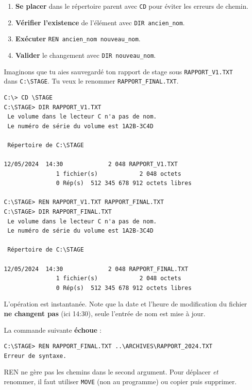 \documentclass[11pt]{article}
\newcommand{\cle}[1]{{\popxbold\color{popdark}#1}}
\begin{document}
\begin{methode}
\begin{enumerate}
    \item \textbf{Se placer} dans le répertoire parent avec \texttt{CD} pour éviter les erreurs de chemin.
    \item \textbf{Vérifier l'existence} de l'élément avec \texttt{DIR ancien\_nom}.
    \item \textbf{Exécuter} \texttt{REN ancien\_nom nouveau\_nom}.
    \item \textbf{Valider} le changement avec \texttt{DIR nouveau\_nom}.
\end{enumerate}
\end{methode}

\begin{exemplebox}
Imaginons que tu aies sauvegardé ton rapport de stage sous \texttt{RAPPORT\_V1.TXT} dans \texttt{C:\textbackslash STAGE}. Tu veux le renommer \texttt{RAPPORT\_FINAL.TXT}.
\begin{lstlisting}
C:\> CD \STAGE
C:\STAGE> DIR RAPPORT_V1.TXT
 Le volume dans le lecteur C n'a pas de nom.
 Le numéro de série du volume est 1A2B-3C4D

 Répertoire de C:\STAGE

12/05/2024  14:30             2 048 RAPPORT_V1.TXT
               1 fichier(s)            2 048 octets
               0 Rép(s)  512 345 678 912 octets libres

C:\STAGE> REN RAPPORT_V1.TXT RAPPORT_FINAL.TXT
C:\STAGE> DIR RAPPORT_FINAL.TXT
 Le volume dans le lecteur C n'a pas de nom.
 Le numéro de série du volume est 1A2B-3C4D

 Répertoire de C:\STAGE

12/05/2024  14:30             2 048 RAPPORT_FINAL.TXT
               1 fichier(s)            2 048 octets
               0 Rép(s)  512 345 678 912 octets libres
\end{lstlisting}
L'opération est instantanée. Note que la date et l'heure de modification du fichier \textbf{ne changent pas} (ici 14:30), seule l'entrée de nom est mise à jour.
\end{exemplebox}

\begin{attention}
La commande suivante \textbf{échoue} :
\begin{lstlisting}
C:\STAGE> REN RAPPORT_FINAL.TXT ..\ARCHIVES\RAPPORT_2024.TXT
Erreur de syntaxe.
\end{lstlisting}
\cle{REN} ne gère pas les chemins dans le second argument. Pour déplacer \emph{et} renommer, il faut utiliser \texttt{MOVE} (non au programme) ou copier puis supprimer.
\end{attention}
\end{document}
